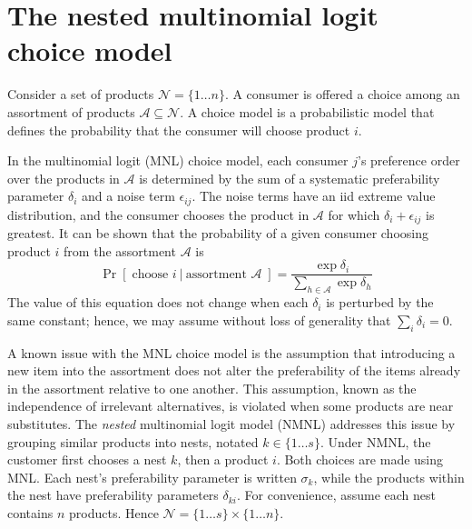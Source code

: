 \documentclass[preprint,12pt,authoryear]{elsarticle}
\begin{document}
\section{The nested multinomial logit choice model}
Consider a set of products $\mathcal{N} = \{1 \dots n\}$. A consumer is offered a choice among an assortment of products $\mathcal{A} \subseteq \mathcal{N}$. A choice model is a probabilistic model that defines the probability that the consumer will choose product $i$.

In the multinomial logit (MNL) choice model, each consumer $j$'s preference order over the products in $\mathcal{A}$ is determined by the sum of a systematic preferability parameter $\delta_i$ and a noise term $\epsilon_{ij}$. The noise terms have an iid extreme value distribution, and the consumer chooses the product in $\mathcal{A}$ for which $\delta_i + \epsilon_{ij}$ is greatest. It can be shown that the probability of a given consumer choosing product $i$ from the assortment $\mathcal{A}$ is
\begin{equation}\label{mnlchoiceprobability}
\operatorname{Pr}\left[\;\text{choose } i ~|~\text{assortment }\mathcal{A}\;\right] =\frac{\exp \delta_i}{\sum_{h\in \mathcal{A}} \exp \delta_h}
\end{equation}
The value of this equation does not change when each $\delta_i$ is perturbed by the same constant; hence, we may assume without loss of generality that $\sum_i \delta_i = 0$.

A known issue with the MNL choice model is the assumption that introducing a new item into the assortment does not alter the preferability of the items already in the assortment relative to one another. This assumption, known as the independence of irrelevant alternatives, is violated when some products are near substitutes. The \emph{nested} multinomial logit model (NMNL) addresses this issue by grouping similar products into nests, notated $k \in \{ 1 \dots s\}$. Under NMNL, the customer first chooses a nest $k$, then a product $i$. Both choices are made using MNL. Each nest's preferability parameter is written $\sigma_k$, while the products within the nest have preferability parameters $\delta_{ki}$. For convenience, assume each nest contains $n$ products. Hence $\mathcal{N} = \{1\dots s\} \times \{1\dots n\}$.
\end{document}

